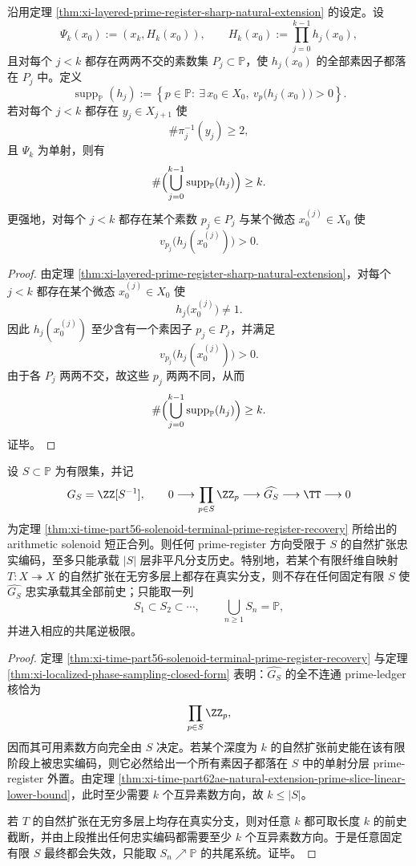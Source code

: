 \begin{theorem}\label{thm:xi-time-part62ae-natural-extension-prime-slice-linear-lower-bound}
沿用定理 \ref{thm:xi-layered-prime-register-sharp-natural-extension} 的设定。设
\[
\Psi_k(x_0):=(x_k,H_k(x_0)),
\qquad
H_k(x_0):=\prod_{j=0}^{k-1}h_j(x_0),
\]
且对每个 \(j<k\) 都存在两两不交的素数集 \(P_j\subset\mathbb P\)，使 \(h_j(x_0)\) 的全部素因子都落在 \(P_j\) 中。定义
\[
\operatorname{supp}_{\mathbb P}(h_j)
:=
\left\{
p\in\mathbb P:\ \exists\,x_0\in X_0,\ v_p\bigl(h_j(x_0)\bigr)>0
\right\}.
\]
若对每个 \(j<k\) 都存在 \(y_j\in X_{j+1}\) 使
\[
\#\pi_j^{-1}(y_j)\ge 2,
\]
且 \(\Psi_k\) 为单射，则有
\[
\#\Bigl(\bigcup_{j=0}^{k-1}\operatorname{supp}_{\mathbb P}(h_j)\Bigr)\ge k.
\]
更强地，对每个 \(j<k\) 都存在某个素数 \(p_j\in P_j\) 与某个微态 \(x_0^{(j)}\in X_0\) 使
\[
v_{p_j}\bigl(h_j(x_0^{(j)})\bigr)>0.
\]
\end{theorem}
\begin{proof}
由定理 \ref{thm:xi-layered-prime-register-sharp-natural-extension}，对每个 \(j<k\) 都存在某个微态 \(x_0^{(j)}\in X_0\) 使
\[
h_j\bigl(x_0^{(j)}\bigr)\neq 1.
\]
因此 \(h_j(x_0^{(j)})\) 至少含有一个素因子 \(p_j\in P_j\)，并满足
\[
v_{p_j}\bigl(h_j(x_0^{(j)})\bigr)>0.
\]
由于各 \(P_j\) 两两不交，故这些 \(p_j\) 两两不同，从而
\[
\#\Bigl(\bigcup_{j=0}^{k-1}\operatorname{supp}_{\mathbb P}(h_j)\Bigr)\ge k.
\]
证毕。
\end{proof}

\begin{corollary}\label{cor:xi-time-part62ae-finite-solenoid-branch-history-capacity}
设 \(S\subset\mathbb P\) 为有限集，并记
\[
G_S=\ZZ[S^{-1}],
\qquad
0\longrightarrow \prod_{p\in S}\ZZ_p
\longrightarrow \widehat{G_S}
\longrightarrow \TT
\longrightarrow 0
\]
为定理 \ref{thm:xi-time-part56-solenoid-terminal-prime-register-recovery} 所给出的 arithmetic solenoid 短正合列。则任何 prime-register 方向受限于 \(S\) 的自然扩张忠实编码，至多只能承载 \(|S|\) 层非平凡分支历史。特别地，若某个有限纤维自映射 \(T:X\twoheadrightarrow X\) 的自然扩张在无穷多层上都存在真实分支，则不存在任何固定有限 \(S\) 使 \(\widehat{G_S}\) 忠实承载其全部前史；只能取一列
\[
S_1\subset S_2\subset\cdots,
\qquad
\bigcup_{n\ge 1}S_n=\mathbb P,
\]
并进入相应的共尾逆极限。
\end{corollary}
\begin{proof}
定理 \ref{thm:xi-time-part56-solenoid-terminal-prime-register-recovery} 与定理 \ref{thm:xi-localized-phase-sampling-closed-form} 表明：\(\widehat{G_S}\) 的全不连通 prime-ledger 核恰为
\[
\prod_{p\in S}\ZZ_p,
\]
因而其可用素数方向完全由 \(S\) 决定。若某个深度为 \(k\) 的自然扩张前史能在该有限阶段上被忠实编码，则它必然给出一个所有素因子都落在 \(S\) 中的单射分层 prime-register 外置。由定理 \ref{thm:xi-time-part62ae-natural-extension-prime-slice-linear-lower-bound}，此时至少需要 \(k\) 个互异素数方向，故 \(k\le |S|\)。

若 \(T\) 的自然扩张在无穷多层上均存在真实分支，则对任意 \(k\) 都可取长度 \(k\) 的前史截断，并由上段推出任何忠实编码都需要至少 \(k\) 个互异素数方向。于是任意固定有限 \(S\) 最终都会失效，只能取 \(S_n\nearrow\mathbb P\) 的共尾系统。证毕。
\end{proof}

